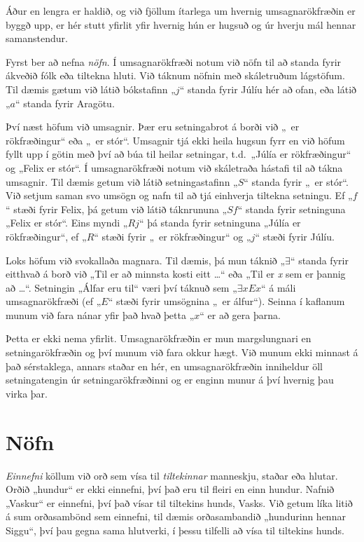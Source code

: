 Áður en lengra er haldið, og við fjöllum ítarlega um hvernig umsagnarökfræðin er byggð upp, er hér stutt yfirlit yfir hvernig hún er hugsuð og úr hverju mál hennar samanstendur.

Fyrst ber að nefna \emph{nöfn}. Í umsagnarökfræði notum við nöfn til að standa fyrir ákveðið fólk eða tiltekna hluti. Við táknum nöfnin með skáletruðum lágstöfum. Til dæmis gætum við látið bókstafinn „$j$“ standa fyrir Júlíu hér að ofan, eða látið „$a$“ standa fyrir Aragötu.

Því næst höfum við umsagnir. Þær eru setningabrot á borði við „\blank\ er rökfræðingur“ eða „\blank\ er stór“. Umsagnir tjá ekki heila hugsun fyrr en við höfum fyllt upp í götin með því að búa til heilar setningar, t.d.\ „Júlía er rökfræðingur“ og „Felix er stór“. Í umsagnarökfræði notum við skáletraða hástafi til að tákna umsagnir. Til dæmis getum við látið setningastafinn „$S$“ standa fyrir „\blank\ er stór“. Við setjum saman svo umsögn og nafn til að tjá einhverja tiltekna setningu. Ef „$f$“ stæði fyrir Felix, þá getum við látið táknrununa „$Sf$“ standa fyrir setninguna „Felix er stór“. Eins myndi „$Rj$“ þá standa fyrir setninguna „Júlía er rökfræðingur“, ef „$R$“ stæði fyrir „\blank\ er rökfræðingur“ og „$j$“ stæði fyrir Júlíu.

Loks höfum við svokallaða magnara. Til dæmis, þá mun táknið „$\exists$“ standa fyrir eitthvað á borð við „Til er að minnsta kosti eitt \ldots“ eða „Til er \emph{x} sem er þannig að \ldots“. Setningin „Álfar eru til“ væri því táknuð sem $„\exists x Ex“$ á máli umsagnarökfræði (ef „$E$“ stæði fyrir umsögnina „\blank\ er álfur“). Seinna í kaflanum munum við fara nánar yfir það hvað þetta „$x$“ er að gera þarna.

Þetta er ekki nema yfirlit. Umsagnarökfræðin er mun margslungnari en setningarökfræðin og því munum við fara okkur hægt. Við munum ekki minnast á það sérstaklega, annars staðar en hér, en umsagnarökfræðin inniheldur öll setningatengin úr setningarökfræðinni og er enginn munur á því hvernig þau virka þar.

\section{Nöfn} %

\emph{Einnefni} köllum við orð sem vísa til \emph{tiltekinnar} manneskju, staðar eða hlutar. Orðið „hundur“ er ekki einnefni, því það eru til fleiri en einn hundur. Nafnið „Vaskur“ er einnefni, því það vísar til tiltekins hunds, Vasks. Við getum líka litið á sum orðasambönd sem einnefni, til dæmis orðasambandið „hundurinn hennar Siggu“, því þau gegna sama hlutverki, í þessu tilfelli að vísa til tiltekins hunds.

